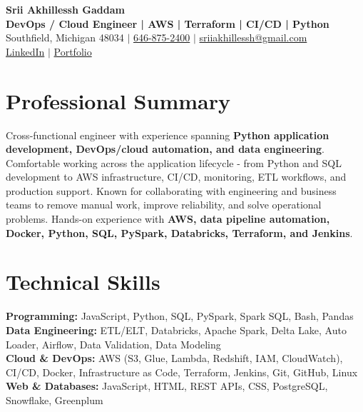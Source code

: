 \documentclass[letterpaper,10pt]{article}
\begin{document}
\fontsize{9.35pt}{10.45pt}\selectfont

\begin{center}
    {\LARGE \textbf{Srii Akhillessh Gaddam}} \\[-1pt]
    \textbf{DevOps / Cloud Engineer | AWS | Terraform | CI/CD | Python} \\[2pt]
    Southfield, Michigan 48034 $|$
    \href{tel:6468752400}{646-875-2400} $|$
    \href{mailto:sriiakhillessh@gmail.com}{sriiakhillessh@gmail.com} \\[1pt]
    \href{https://www.linkedin.com/in/srii-akhiilessh-gaddam-b48668191/}{LinkedIn} $|$
    \href{https://sriiakhillesshg.github.io/portfolio/}{Portfolio}
\end{center}
\vspace{-8pt}

\section{Professional Summary}
\small{Cross-functional engineer with experience spanning \textbf{Python application development, DevOps/cloud automation, and data engineering}. Comfortable working across the application lifecycle - from Python and SQL development to AWS infrastructure, CI/CD, monitoring, ETL workflows, and production support. Known for collaborating with engineering and business teams to remove manual work, improve reliability, and solve operational problems. Hands-on experience with \textbf{AWS, data pipeline automation, Docker, Python, SQL, PySpark, Databricks, Terraform, and Jenkins}.}

\section{Technical Skills}
\small{
\textbf{Programming:} JavaScript, Python, SQL, PySpark, Spark SQL, Bash, Pandas \\
\textbf{Data Engineering:} ETL/ELT, Databricks, Apache Spark, Delta Lake, Auto Loader, Airflow, Data Validation, Data Modeling \\
\textbf{Cloud \& DevOps:} AWS (S3, Glue, Lambda, Redshift, IAM, CloudWatch), CI/CD, Docker, Infrastructure as Code, Terraform, Jenkins, Git, GitHub, Linux \\
\textbf{Web \& Databases:} JavaScript, HTML, REST APIs, CSS, PostgreSQL, Snowflake, Greenplum
}
\end{document}
